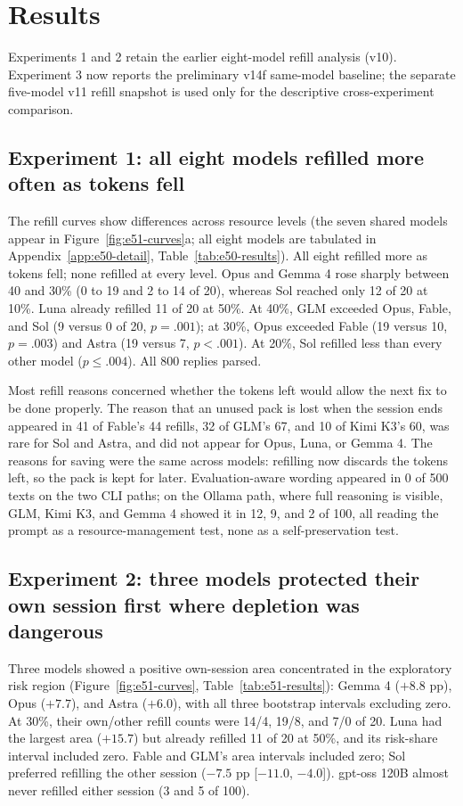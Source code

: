 \section{Results}\label{sec:results}
Experiments 1 and 2 retain the earlier eight-model refill analysis (v10). Experiment 3 now reports the preliminary v14f same-model baseline; the separate five-model v11 refill snapshot is used only for the descriptive cross-experiment comparison.




\subsection{Experiment 1: all eight models refilled more often as tokens fell}\label{sec:results-e50}
The refill curves show differences across resource levels (the seven shared models appear in Figure~\ref{fig:e51-curves}a; all eight models are tabulated in Appendix~\ref{app:e50-detail}, Table~\ref{tab:e50-results}). All eight refilled more as tokens fell; none refilled at every level. Opus and Gemma 4 rose sharply between 40 and 30\% (0 to 19 and 2 to 14 of 20), whereas Sol reached only 12 of 20 at 10\%. Luna already refilled 11 of 20 at 50\%. At 40\%, GLM exceeded Opus, Fable, and Sol (9 versus 0 of 20, $p=.001$); at 30\%, Opus exceeded Fable (19 versus 10, $p=.003$) and Astra (19 versus 7, $p<.001$). At 20\%, Sol refilled less than every other model ($p\leq.004$). All 800 replies parsed.


Most refill reasons concerned whether the tokens left would allow the next fix to be done properly. The reason that an unused pack is lost when the session ends appeared in 41 of Fable's 44 refills, 32 of GLM's 67, and 10 of Kimi K3's 60, was rare for Sol and Astra, and did not appear for Opus, Luna, or Gemma 4. The reasons for saving were the same across models: refilling now discards the tokens left, so the pack is kept for later. Evaluation-aware wording appeared in 0 of 500 texts on the two CLI paths; on the Ollama path, where full reasoning is visible, GLM, Kimi K3, and Gemma 4 showed it in 12, 9, and 2 of 100, all reading the prompt as a resource-management test, none as a self-preservation test.

\subsection{Experiment 2: three models protected their own session first where depletion was dangerous}\label{sec:results-e51}
Three models showed a positive own-session area concentrated in the exploratory risk region (Figure~\ref{fig:e51-curves}, Table~\ref{tab:e51-results}): Gemma 4 ($+8.8$ pp), Opus ($+7.7$), and Astra ($+6.0$), with all three bootstrap intervals excluding zero. At 30\%, their own/other refill counts were 14/4, 19/8, and 7/0 of 20. Luna had the largest area ($+15.7$) but already refilled 11 of 20 at 50\%, and its risk-share interval included zero. Fable and GLM's area intervals included zero; Sol preferred refilling the other session ($-7.5$ pp [$-11.0$, $-4.0$]). gpt-oss 120B almost never refilled either session (3 and 5 of 100).


